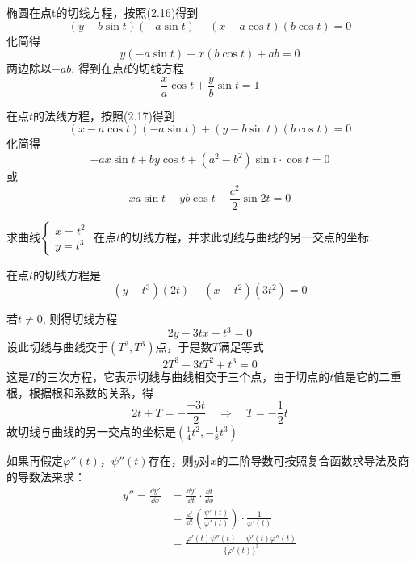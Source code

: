 \begin{solution}
椭圆在点t的切线方程，按照(2.16)得到
\[(y-b\sin t) (-a\sin t )-(x-a\cos t)(b\cos t)=0\]
    化简得
 \[   y ( - a\sin t) - x(b\cos t)+ab=0\]
    两边除以$-ab$, 得到在点$t$的切线方程
\[\frac{x}{a}\cos t+\frac{y}{b}\sin t=1\]

在点$t$的法线方程，按照(2.17)得到
\[(x-a\cos t) (-a\sin t)+(y-b\sin t)(b\cos t)=0\]
    化简得
\[   -ax\sin t+by\cos t+ (a^2-b^2) \sin t\cdot \cos t=0\]
    或
    \[xa\sin t-yb\cos t-\frac{c^2}{2}\sin 2t=0\]
\end{solution}    

\begin{example}
    求曲线$\begin{cases}
        x=t^2\\y=t^3
    \end{cases}$
    在点$t$的切线方程，并求此切线与曲线的另一交点的坐标.
\end{example}

\begin{solution}
在点$t$的切线方程是
\[(y-t^3)(2t)-(x-t^2)(3t^2)=0\]

若$t\ne 0$, 则得切线方程
  \[  2y-3tx+t^3=0\]
    设此切线与曲线交于$(T^2,T^3)$点，于是数$T$满足等式
   \[ 2T^3-3tT^2+t^3=0\]
    这是$T$的三次方程，它表示切线与曲线相交于三个点，由于切点的$t$值是它的二重根，根据根和系数的关系，得
\[2t+T=-\frac{-3t}{2}\quad \Rightarrow\quad T=-\frac{1}{2}t\]
故切线与曲线的另一交点的坐标是$\left(\frac{1}{4}t^2,-\frac{1}{8}t^3\right)$
\end{solution}

如果再假定$\varphi''(t)$，$\psi''(t)$存在，则$y$对$x$的二阶导数可按照复合函数求导法及商的导数法来求：
\begin{align*}
    y''=\frac{\dd y'}{\dd x}&=\frac{\dd y'}{\dd t}\cdot \frac{\dd t}{\dd x}\\
    &=\frac{\dd }{\dd t}\left(\frac{\psi'(t)}{\varphi'(t)}\right)\cdot \frac{1}{\varphi'(t)}\\
    &=\frac{\varphi'(t)\psi''(t)-\psi'(t)\varphi''(t)}{\big\{\varphi'(t)\big\}^3}
\end{align*}

